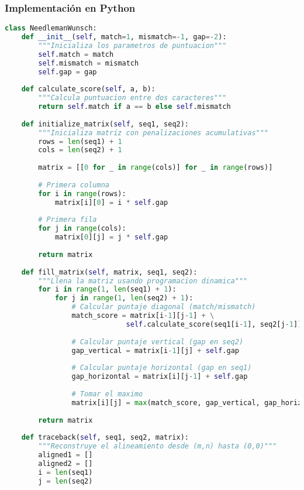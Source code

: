 \documentclass[12pt,a4paper]{article}
\begin{document}
\subsubsection{Implementación en Python}

\begin{lstlisting}[language=Python, caption=Clase NeedlemanWunsch en Python]
class NeedlemanWunsch:
    def __init__(self, match=1, mismatch=-1, gap=-2):
        """Inicializa los parametros de puntuacion"""
        self.match = match
        self.mismatch = mismatch
        self.gap = gap
    
    def calculate_score(self, a, b):
        """Calcula puntuacion entre dos caracteres"""
        return self.match if a == b else self.mismatch
    
    def initialize_matrix(self, seq1, seq2):
        """Inicializa matriz con penalizaciones acumulativas"""
        rows = len(seq1) + 1
        cols = len(seq2) + 1
        
        matrix = [[0 for _ in range(cols)] for _ in range(rows)]
        
        # Primera columna
        for i in range(rows):
            matrix[i][0] = i * self.gap
        
        # Primera fila
        for j in range(cols):
            matrix[0][j] = j * self.gap
        
        return matrix
    
    def fill_matrix(self, matrix, seq1, seq2):
        """Llena la matriz usando programacion dinamica"""
        for i in range(1, len(seq1) + 1):
            for j in range(1, len(seq2) + 1):
                # Calcular puntaje diagonal (match/mismatch)
                match_score = matrix[i-1][j-1] + \
                             self.calculate_score(seq1[i-1], seq2[j-1])
                
                # Calcular puntaje vertical (gap en seq2)
                gap_vertical = matrix[i-1][j] + self.gap
                
                # Calcular puntaje horizontal (gap en seq1)
                gap_horizontal = matrix[i][j-1] + self.gap
                
                # Tomar el maximo
                matrix[i][j] = max(match_score, gap_vertical, gap_horizontal)
        
        return matrix
    
    def traceback(self, seq1, seq2, matrix):
        """Reconstruye el alineamiento desde (m,n) hasta (0,0)"""
        aligned1 = []
        aligned2 = []
        i = len(seq1)
        j = len(seq2)
        

\end{lstlisting}
\end{document}

